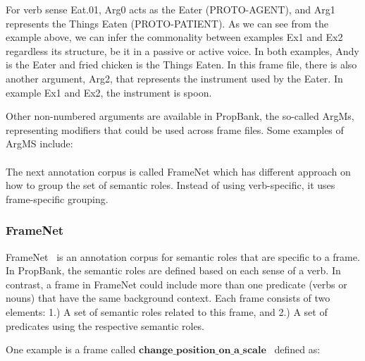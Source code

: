 For verb sense Eat.01, Arg0 acts as the Eater (PROTO-AGENT), and Arg1 represents the Things Eaten (PROTO-PATIENT). As we can see from the example above, we can infer the commonality between examples Ex1 and Ex2 regardless its structure, be it in a passive or active voice. In both examples, Andy is the Eater and fried chicken is the Things Eaten. In this frame file, there is also another argument, Arg2, that represents the instrument used by the Eater. In example Ex1 and Ex2, the instrument is spoon.

Other non-numbered arguments are available in PropBank, the so-called ArgMs, representing modifiers that could be used across frame files. Some examples of ArgMS include:
\\
\\

The next annotation corpus is called FrameNet which has different approach on how to group the set of semantic roles. Instead of using verb-specific, it uses frame-specific grouping.

\subsubsection{FrameNet}
FrameNet~\citep{baker1998berkeley} is an annotation corpus for semantic roles that are specific to a frame. In PropBank, the semantic roles are defined based on each sense of a verb. In contrast, a frame in FrameNet could include more than one predicate (verbs or nouns) that have the same background context. Each frame consists of two elements: 1.) A set of semantic roles related to this frame, and 2.) A set of predicates using the respective semantic roles.

One example is a frame called $\mathbf{change\_position\_on\_a\_scale}$~\citep{jurafsky2016speech} defined as:
\\
\\

